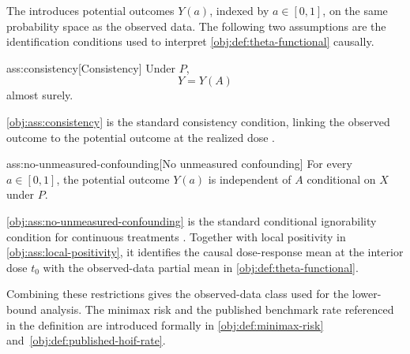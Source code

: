 The  introduces potential outcomes \(Y(a)\), indexed by \(a\in[0,1]\), on the same probability space as the observed data. The following two assumptions are the identification conditions used to interpret \cref{obj:def:theta-functional} causally.

\begin{assumptionv}{ass:consistency}[Consistency]
Under \(P\),
\[
Y=Y(A)
\]
almost surely.
\end{assumptionv}

\cref{obj:ass:consistency} is the standard consistency condition, linking the observed outcome to the potential outcome at the realized dose \citep{kennedy2017}.

\begin{assumptionv}{ass:no-unmeasured-confounding}[No unmeasured confounding]
For every \(a\in[0,1]\), the potential outcome \(Y(a)\) is independent of \(A\) conditional on \(X\) under \(P\).
\end{assumptionv}

\cref{obj:ass:no-unmeasured-confounding} is the standard conditional ignorability condition for continuous treatments \citep{kennedy2017}. Together with local positivity in \cref{obj:ass:local-positivity}, it identifies the causal dose-response mean at the interior dose \(t_0\) with the observed-data partial mean in \cref{obj:def:theta-functional}.

Combining these restrictions gives the observed-data class used for the lower-bound analysis. The minimax risk and the published benchmark rate referenced in the definition are introduced formally in \cref{obj:def:minimax-risk} and~\cref{obj:def:published-hoif-rate}.

